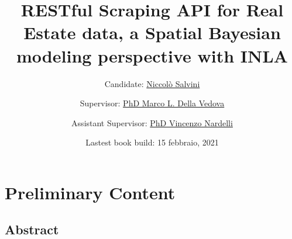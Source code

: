 \documentclass[
  12pt,
  a4paper,
  oneside]{book}
\title{RESTful Scraping API for Real Estate data, a Spatial Bayesian modeling perspective with INLA}
\author{Candidate: \href{https://niccolosalvini.netlify.app/}{Niccolò Salvini} \and Supervisor: \href{https://mldv.it/home/}{PhD Marco L. Della Vedova} \and Assistant Supervisor: \href{https://github.com/vincnardelli}{PhD Vincenzo Nardelli}}
\date{Lastest book build: 15 febbraio, 2021}
\let\oldmaketitle\maketitle
\theoremstyle{definition}
\theoremstyle{definition}
\theoremstyle{definition}
\theoremstyle{remark}
\begin{document}
\maketitle


\newpage

\let\maketitle\oldmaketitle
\maketitle

{
\setcounter{tocdepth}{2}
\tableofcontents
}
\listoftables
\listoffigures
{}
\hypertarget{preliminary-content}{%
\chapter*{Preliminary Content}\label{preliminary-content}}

\hypertarget{abstract}{%
\section*{Abstract}\label{abstract}}
\end{document}
